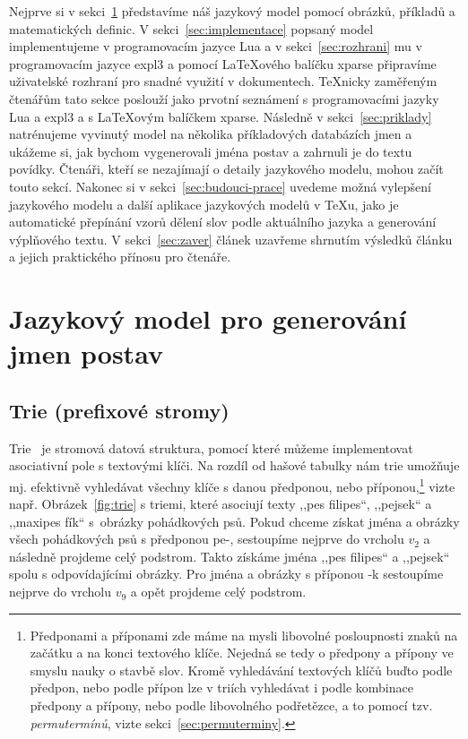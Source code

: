 \documentclass{csbulletin}
\newcommand\vref[1]{\ref{#1} na straně~\pageref{#1}}
\let\vref=\ref
\begin{document}
Nejprve si v sekci~\ref{sec:definice} představíme náš jazykový model pomocí obrázků, příkladů a matematických definic. V sekci~\vref{sec:implementace} popsaný model implementujeme v programovacím jazyce Lua a v sekci~\vref{sec:rozhrani} mu v programovacím jazyce expl3 a pomocí \LaTeX ového balíčku xparse připravíme uživatelské rozhraní pro snadné využití v dokumentech. \TeX nicky zaměřeným čtenářům tato sekce poslouží jako prvotní seznámení s programovacími jazyky Lua a expl3 a s \LaTeX ovým balíčkem xparse. Následně v sekci~\vref{sec:priklady} natrénujeme vyvinutý model na několika příkladových databázích jmen a ukážeme si, jak bychom vygenerovali jména postav a zahrnuli je do textu povídky. Čtenáři, kteří se nezajímají o detaily jazykového modelu, mohou začít touto sekcí. Nakonec si v sekci~\vref{sec:budouci-prace} uvedeme možná vylepšení jazykového modelu a další aplikace jazykových modelů v \TeX u, jako je automatické přepínání vzorů dělení slov podle aktuálního jazyka a generování výplňového textu. V sekci~\vref{sec:zaver} článek uzavřeme shrnutím výsledků článku a jejich praktického přínosu pro čtenáře.

\section{Jazykový model pro generování jmen postav}
\label{sec:definice}
\subsection{Trie (prefixové stromy)}
Trie~\cite{knuth1997digital} je stromová datová struktura, pomocí které můžeme implementovat asociativní pole s textovými klíči. Na rozdíl od hašové tabulky nám trie umožňuje mj. efektivně vyhledávat všechny klíče s danou předponou, nebo příponou,\footnote{Předponami a příponami zde máme na mysli libovolné posloupnosti znaků na začátku a na konci textového klíče. Nejedná se tedy o předpony a přípony ve smyslu nauky o stavbě slov. Kromě vyhledávání textových klíčů buďto podle předpon, nebo podle přípon lze v triích vyhledávat i podle kombinace předpony a přípony, nebo podle libovolného podřetězce, a to pomocí tzv. \emph{permutermínů}, vizte sekci~\vref{sec:permuterminy}.} vizte např. Obrázek~\ref{fig:trie} s triemi, které asociují texty ,,pes filipes``, ,,pejsek`` a ,,maxipes fík`` s~obrázky pohádkových psů. Pokud chceme získat jména a obrázky všech pohádkových psů s předponou pe-, sestoupíme nejprve do vrcholu $v_2$ a následně projdeme celý podstrom. Takto získáme jména ,,pes filipes`` a ,,pejsek`` spolu s odpovídajícími obrázky. Pro jména a obrázky s příponou -k sestoupíme nejprve do vrcholu $v_9$ a opět projdeme celý podstrom.
\end{document}
